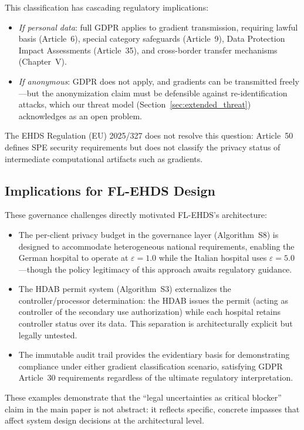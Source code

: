 \documentclass[conference,a4paper]{IEEEtran}
\begin{document}
This classification has cascading regulatory implications:
\begin{itemize}
    \item \textit{If personal data}: full GDPR applies to gradient transmission, requiring lawful basis (Article~6), special category safeguards (Article~9), Data Protection Impact Assessments (Article~35), and cross-border transfer mechanisms (Chapter~V).
    \item \textit{If anonymous}: GDPR does not apply, and gradients can be transmitted freely---but the anonymization claim must be defensible against re-identification attacks, which our threat model (Section~\ref{sec:extended_threat}) acknowledges as an open problem.
\end{itemize}

The EHDS Regulation (EU) 2025/327 does not resolve this question: Article~50 defines SPE security requirements but does not classify the privacy status of intermediate computational artifacts such as gradients.

\subsection{Implications for FL-EHDS Design}

These governance challenges directly motivated FL-EHDS's architecture:
\begin{itemize}
    \item The per-client privacy budget in the governance layer (Algorithm~S8) is designed to accommodate heterogeneous national requirements, enabling the German hospital to operate at $\varepsilon = 1.0$ while the Italian hospital uses $\varepsilon = 5.0$---though the policy legitimacy of this approach awaits regulatory guidance.
    \item The HDAB permit system (Algorithm~S3) externalizes the controller/processor determination: the HDAB issues the permit (acting as controller of the secondary use authorization) while each hospital retains controller status over its data. This separation is architecturally explicit but legally untested.
    \item The immutable audit trail provides the evidentiary basis for demonstrating compliance under either gradient classification scenario, satisfying GDPR Article~30 requirements regardless of the ultimate regulatory interpretation.
\end{itemize}

These examples demonstrate that the ``legal uncertainties as critical blocker'' claim in the main paper is not abstract: it reflects specific, concrete impasses that affect system design decisions at the architectural level.
\end{document}
